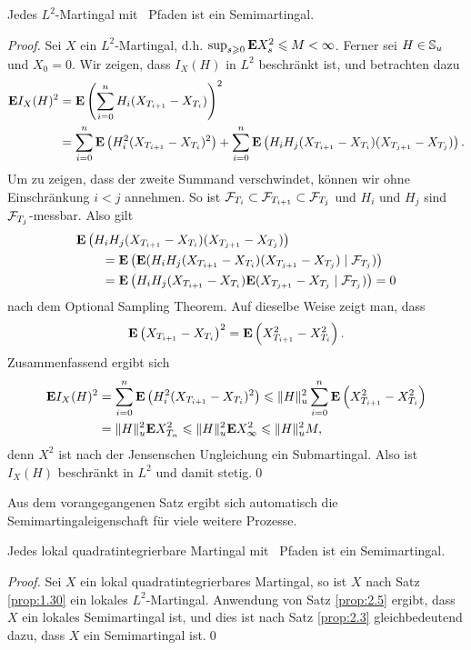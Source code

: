 \begin{prop}
\label{prop:2.5}
Jedes $L^2$-Martingal mit \cadlag\ Pfaden ist ein Semimartingal.\fish
\end{prop}
\begin{proof}
Sei $X$ ein $L^2$-Martingal, d.h. $\sup_{s\ge 0} \E X_s^2 \le M < \infty$.
Ferner sei $H\in \S_u$ und $X_0 = 0$. Wir zeigen, dass $I_X(H)$ in
$L^2$ beschränkt ist, und betrachten dazu
\begin{align*}
\E I_X(H)^2 &= \E \left(\sum_{i=0}^n H_i(X_{T_{i+1}}-X_{T_i}) \right)^2\\
&=
\sum_{i=0}^n \E\left( H_i^2(X_{T_{i+1}}-X_{T_i})^2 \right)
+
\sum_{i=0}^n\E\left(  H_iH_j(X_{T_{i+1}}-X_{T_i})(X_{T_{j+1}}-X_{T_j})
\right).
\end{align*}
Um zu zeigen, dass der zweite Summand verschwindet, können wir ohne
Einschränkung $i < j$ annehmen. So ist $\FF_{T_i} \subset \FF_{T_{i+1}} \subset
\FF_{T_j}$ und $H_i$ und $H_j$ sind $\FF_{T_j}$-messbar. Also gilt
\begin{align*}
&\E  \left(H_iH_j(X_{T_{i+1}}-X_{T_i})(X_{T_{j+1}}-X_{T_j})\right)\\
&\qquad=
\E \left(\E (H_iH_j(X_{T_{i+1}}-X_{T_i})(X_{T_{j+1}}-X_{T_j})\mid
\FF_{T_j})\right) \\
&\qquad =
\E \left(H_iH_j(X_{T_{i+1}}-X_{T_i})\E (X_{T_{j+1}}-X_{T_j}\mid
\FF_{T_j})\right) = 0
\end{align*}
nach dem Optional Sampling Theorem. Auf dieselbe Weise zeigt man, dass
\begin{align*}
\E\left( X_{T_{i+1}}-X_{T_i} \right)^2
= 
\E\left( X_{T_{i+1}}^2-X_{T_i}^2 \right).
\end{align*}
Zusammenfassend ergibt sich
\begin{align*}
\E I_X(H)^2 &=
\sum_{i=0}^n \E\left( H_i^2 (X_{T_{i+1}}-X_{T_i})^2\right)
\le
\norm{H}_u^2
\sum_{i=0}^n \E\left( X_{T_{i+1}}^2-X_{T_i}^2\right)\\
&= \norm{H}_u^2 \E X_{T_n}^2 \le \norm{H}_u^2 \E X_\infty^2 \le \norm{H}_u^2 M,
\end{align*}
denn $X^2$ ist nach der Jensenschen Ungleichung ein Submartingal. Also ist
$I_X(H)$ beschränkt in $L^2$ und damit stetig.\qed
\end{proof}

Aus dem vorangegangenen Satz ergibt sich automatisch die
Semimartingaleigenschaft für viele weitere Prozesse.

\begin{korollar}
\label{cor:2.1}
Jedes lokal quadratintegrierbare Martingal mit \cadlag\ Pfaden
ist ein Semimartingal.\fish
\end{korollar}
\begin{proof}
Sei $X$ ein lokal quadratintegrierbares Martingal, so ist $X$ nach Satz
\ref{prop:1.30} ein lokales $L^2$-Martingal. Anwendung von Satz \ref{prop:2.5}
ergibt, dass $X$ ein lokales Semimartingal ist, und dies ist nach Satz
\ref{prop:2.3} gleichbedeutend dazu, dass $X$ ein Semimartingal ist.\qed
\end{proof}

